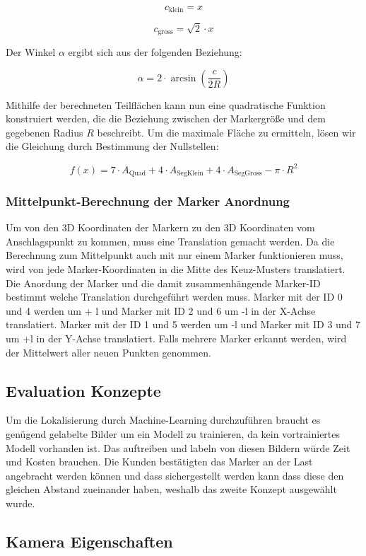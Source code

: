 \[
c_\text{klein} = x
\]

\[
c_\text{gross} = \sqrt{2} \cdot x
\]

Der Winkel \(\alpha\) ergibt sich aus der folgenden Beziehung:

\[
\alpha = 2 \cdot \arcsin\left(\frac{c}{2R}\right)
\]

Mithilfe der berechneten Teilflächen kann nun eine quadratische Funktion konstruiert werden, die die Beziehung zwischen der Markergröße und dem gegebenen Radius \(R\) beschreibt. Um die maximale Fläche zu ermitteln, lösen wir die Gleichung durch Bestimmung der Nullstellen:

\[
f(x) = 7 \cdot A_\text{Quad} + 4 \cdot A_\text{SegKlein} + 4 \cdot A_\text{SegGross} - \pi \cdot R^2
\]


\subsubsection{Mittelpunkt-Berechnung der Marker Anordnung}
\label{sec:middlePoint}

Um von den 3D Koordinaten der Markern zu den 3D Koordinaten vom Anschlagspunkt zu kommen, muss eine Translation gemacht werden. Da die Berechnung zum Mittelpunkt auch mit nur einem Marker funktionieren muss, wird von jede Marker-Koordinaten in die Mitte des Keuz-Musters translatiert. Die Anordung der Marker und die damit zusammenhängende Marker-ID bestimmt welche Translation durchgeführt werden muss. Marker mit der ID 0 und 4 werden um + l und Marker mit ID 2 und 6 um -l in der X-Achse translatiert. Marker mit der ID 1 und 5 werden um -l und Marker mit ID 3 und 7 um +l in der Y-Achse translatiert. Falls mehrere Marker erkannt werden, wird der Mittelwert aller neuen Punkten genommen.

\subsection{Evaluation Konzepte}
Um die Lokalisierung durch Machine-Learning durchzuführen braucht es genügend gelabelte Bilder um ein Modell zu trainieren, da kein vortrainiertes Modell vorhanden ist. Das auftreiben und labeln von diesen Bildern würde Zeit und Kosten brauchen. Die Kunden bestätigten das Marker an der Last angebracht werden können und dass sichergestellt werden kann dass diese den gleichen Abstand zueinander haben, weshalb das zweite Konzept ausgewählt wurde.

\subsection{Kamera Eigenschaften}

